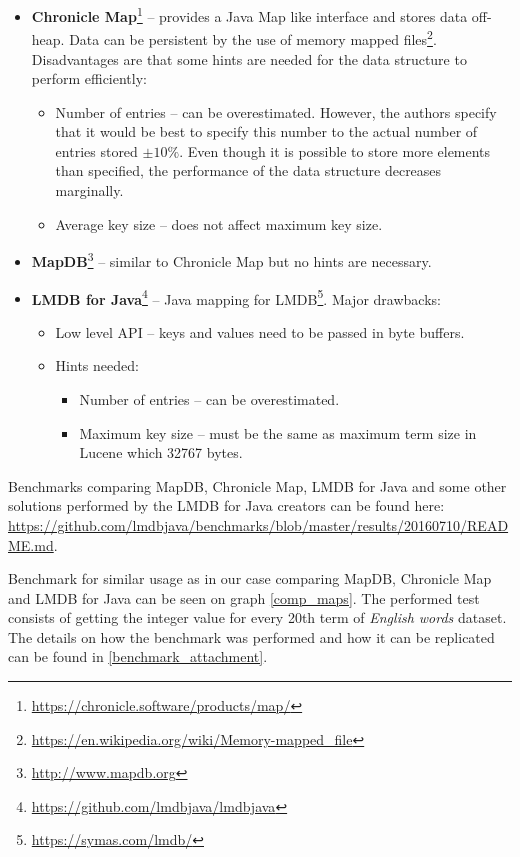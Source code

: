 \begin{itemize}
    \item \textbf{Chronicle Map}\footnote{\url{https://chronicle.software/products/map/}} – provides a Java Map like
    interface and stores data off-heap. Data can be persistent by the use of memory mapped
    files\footnote{\url{https://en.wikipedia.org/wiki/Memory-mapped\_file}}. Disadvantages are that some hints are
    needed for the data structure to perform efficiently:
    \begin{itemize}
        \item Number of entries – can be overestimated. However, the authors specify that it would be best to specify
        this number to the actual number of entries stored $\pm 10\%$. Even though it is possible to store more elements
        than specified, the performance of the data structure decreases marginally.
        \item Average key size – does not affect maximum key size.
    \end{itemize}

    \item \textbf{MapDB}\footnote{\url{http://www.mapdb.org}} – similar to Chronicle Map but no hints are necessary.

    \item \textbf{LMDB for Java}\footnote{\url{https://github.com/lmdbjava/lmdbjava}} – Java mapping for
    LMDB\footnote{\url{https://symas.com/lmdb/}}. Major drawbacks:
    \begin{itemize}
        \item Low level API – keys and values need to be passed in byte buffers.
        \item Hints needed:
            \begin{itemize}
                \item Number of entries – can be overestimated.
                \item Maximum key size – must be the same as maximum term size in Lucene which 32767 bytes.
            \end{itemize}
    \end{itemize}
\end{itemize}

Benchmarks comparing MapDB, Chronicle Map, LMDB for Java and some other solutions performed by the LMDB for Java creators
can be found here:
\url{https://github.com/lmdbjava/benchmarks/blob/master/results/20160710/README.md}.

Benchmark for similar usage as in our case comparing MapDB, Chronicle Map and LMDB for Java can be seen on graph \ref{comp_maps}.
The performed test consists of getting the integer value for every 20th term of \textit{English words} dataset.
The details on how the benchmark was performed and how it can be replicated can be found in \ref{benchmark_attachment}.


